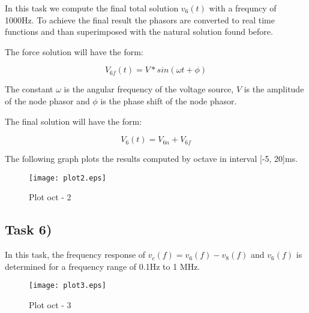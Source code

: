 In this task we compute the final total solution $v_6(t)$ with a frequncy of 1000Hz. To achieve the final result the phasors are converted to real time functions and than superimposed with the natural solution found before.

The force solution will have the form:

\[
V_{6f}(t) = V*sin(\omega t + \phi)
\]

The constant $\omega$ is the angular frequency of the voltage source, $V$ is the amplitude of the node phasor and $\phi$ is the phase shift of the node phasor.

The final solution will have the form:

\[
V_6(t) = V_{6n} + V_{6f}
\]

The following graph plots the results computed by octave in interval [-5, 20]ms.

\begin{figure}[ht]
	\centering
	\texttt{[image: plot2.eps]}
	\caption{Plot oct - 2}
\label{fig:Dsnh_sim_t2}
\end{figure}

\subsection{Task 6)}
\label{subsec:task6_a}

In this task, the frequency response of $v_c(f)= v_6(f) - v_8(f)$ and $v_6(f)$ is determined for a frequency range of 0.1Hz to 1 MHz.

\begin{figure}[ht]
	\centering
	\texttt{[image: plot3.eps]}
	\caption{Plot oct - 3}
\label{fig:Dsnh_sim_t2}
\end{figure}



